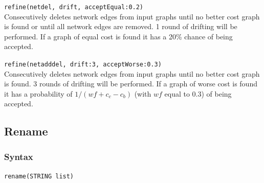 \begin{example}
		\item{\texttt{refine(netdel, drift, acceptEqual:0.2)} \\ 
		Consecutively deletes network edges from input graphs until no better cost
		graph is found or until all network edges are removed. 1 round of drifting 
		will be performed. If a graph of equal cost is found it has a 20\% chance 
		of being accepted.}
		
		\item{\texttt{refine(netadddel, drift:3, acceptWorse:0.3)} \\ 
		Consecutively deletes network edges from input graphs until no better cost
		graph is found. 3 rounds of drifting will be performed. If a graph of worse
		cost is found it has a probability of $1/ (wf + c_c - c_b)$ (with $wf$ equal to 
		   0.3) of being accepted.}
		
	\end{example}
	
\subsection{Rename}
	\label{subsec:Rename}
	\subsubsection{Syntax}
		\texttt{rename(STRING list)}
		
